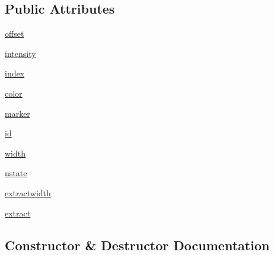 \subsection*{Public Attributes}
\begin{DoxyCompactItemize}
\item 
\hyperlink{class_uni_dec_1_1unidec__modules_1_1nativez_1_1_zoffset_a9b1e6480531d69e340c5db96ed14fbf5}{offset}
\item 
\hyperlink{class_uni_dec_1_1unidec__modules_1_1nativez_1_1_zoffset_a02aad0da32cc8d3ec5d22b99cbb5cc01}{intensity}
\item 
\hyperlink{class_uni_dec_1_1unidec__modules_1_1nativez_1_1_zoffset_a58bc2d000e3867c54b63ba0ad2b78faa}{index}
\item 
\hyperlink{class_uni_dec_1_1unidec__modules_1_1nativez_1_1_zoffset_a457f79df370d2dc7327ac490387b7a75}{color}
\item 
\hyperlink{class_uni_dec_1_1unidec__modules_1_1nativez_1_1_zoffset_a5c3608e4a0b75cb87244d5dba45587e5}{marker}
\item 
\hyperlink{class_uni_dec_1_1unidec__modules_1_1nativez_1_1_zoffset_ada465f26660fe0c09cd18efb7d76b4f4}{id}
\item 
\hyperlink{class_uni_dec_1_1unidec__modules_1_1nativez_1_1_zoffset_ac7f6519ba9f4272be97e93877e9c8a41}{width}
\item 
\hyperlink{class_uni_dec_1_1unidec__modules_1_1nativez_1_1_zoffset_a0c852917509c00a618e35d443efa9147}{nstate}
\item 
\hyperlink{class_uni_dec_1_1unidec__modules_1_1nativez_1_1_zoffset_a98e00934e8db4e28ea9da6d23f663b3f}{extractwidth}
\item 
\hyperlink{class_uni_dec_1_1unidec__modules_1_1nativez_1_1_zoffset_a5c8ca4759fe5ddf1be7dd2db08c5c5b1}{extract}
\end{DoxyCompactItemize}


\subsection{Constructor \& Destructor Documentation}
\hypertarget{class_uni_dec_1_1unidec__modules_1_1nativez_1_1_zoffset_a01cadcc3a370875587f72b21be8307c0}{}
